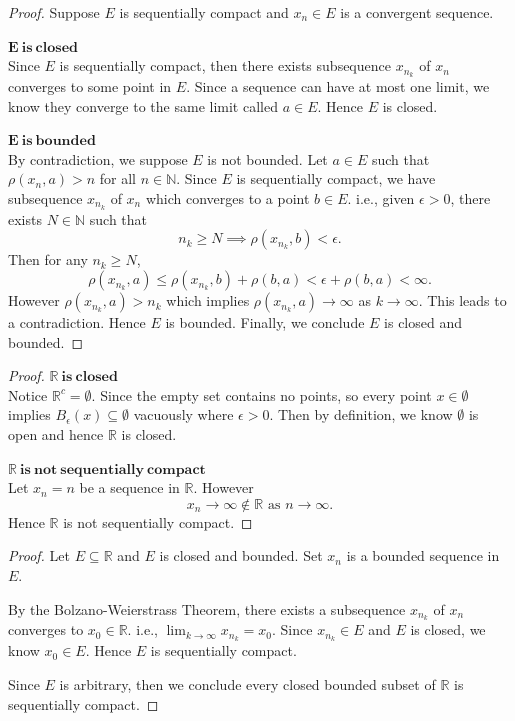 \begin{Exercise}
\begin{enumerate}[a)]
\item
\begin{proof}
Suppose $E$ is sequentially compact and $x_n \in E$ is a convergent sequence.
\item [$\mathbf{E\ is\ closed}$] ~\\
Since $E$ is sequentially compact, then there exists subsequence $x_{n_k}$ of $x_n$ converges to some point in $E$. Since a sequence can have at most one limit, we know they converge to the same limit called $a\in E$. Hence $E$ is closed.
\item [$\mathbf{E\ is\ bounded}$] ~\\
By contradiction, we suppose $E$ is not bounded. Let $a\in E$ such that $\rho(x_n, a) > n$ for all $n\in\mathbb{N}$. Since $E$ is sequentially compact, we have subsequence $x_{n_k}$ of $x_n$ which converges to a point $b\in E$. i.e., given $\epsilon > 0$, there exists $N\in\mathbb{N}$ such that
$$
n_k\geq N \implies \rho(x_{n_k}, b) < \epsilon.
$$
Then for any $n_k \geq N$,
$$
\rho(x_{n_k}, a)
\leq \rho(x_{n_k}, b) + \rho(b, a)
< \epsilon + \rho(b,a)
< \infty.
$$
However $\rho(x_{n_k}, a) > n_k$ which implies $\rho(x_{n_k}, a)\to\infty$ as $k\to\infty$. This leads to a contradiction. Hence $E$ is bounded.
Finally, we conclude $E$ is closed and bounded.
\end{proof}

\item
\begin{proof}
\item [$\mathbf{\mathbb{R}\ is\ closed}$] ~\\
Notice $\mathbb{R}^c = \emptyset$. Since the empty set contains no points, so every point $x\in\emptyset$ implies $B_{\epsilon}(x) \subseteq \emptyset$ vacuously where $\epsilon>0$. Then by definition, we know $\emptyset$ is open and hence $\mathbb{R}$ is closed.

\item [$\mathbf{\mathbb{R}\ is\ not\ sequentially\ compact}$] ~\\
Let $x_n = n$ be a sequence in $\mathbb{R}$. However $$x_n \to\infty\notin\mathbb{R}\text{ as } n\to\infty.$$
Hence $\mathbb{R}$ is not sequentially compact.
\end{proof}

\item
\begin{proof}
Let $E \subseteq \mathbb{R}$ and $E$ is closed and bounded. Set $x_n$ is a bounded sequence in $E$.

By the Bolzano-Weierstrass Theorem, there exists a subsequence $x_{n_k}$ of $x_n$ converges to $x_0 \in \mathbb{R}$. i.e., $\lim_{k\to\infty}x_{n_k} = x_0$. Since $x_{n_k} \in E$ and $E$ is closed, we know $x_0\in E$. Hence $E$ is sequentially compact. 

Since $E$ is arbitrary, then we conclude every closed bounded subset of $\mathbb{R}$ is sequentially compact.
\end{proof}
\end{enumerate}
\end{Exercise}